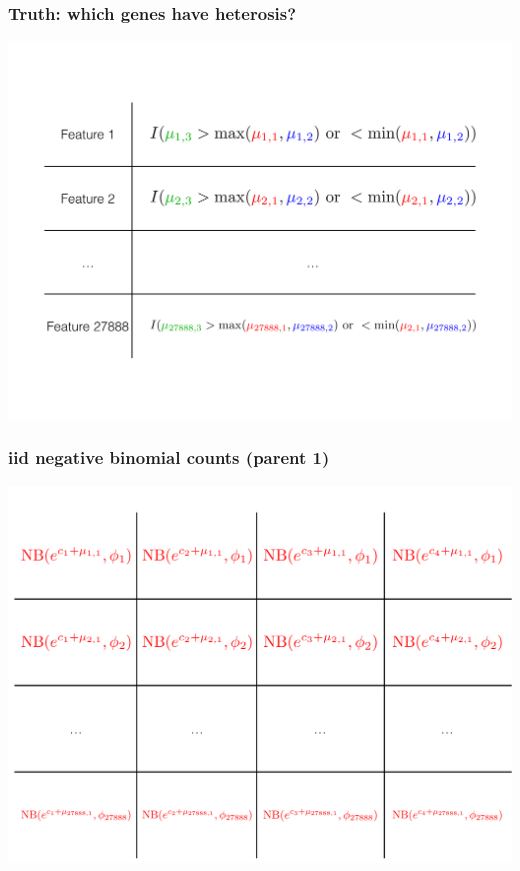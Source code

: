 \documentclass[handout]{beamer}
\numberwithin{equation}{section}
\begin{document}
\begin{frame}
\frametitle{Truth: which genes have heterosis?}
\begin{center}
\includegraphics[scale=.28]{truth}
\end{center}
\end{frame}

\begin{frame}
\frametitle{iid negative binomial counts (parent 1)}
\begin{center}
\includegraphics[scale=.28]{dists}
\end{center}
\end{frame}
\end{document}
